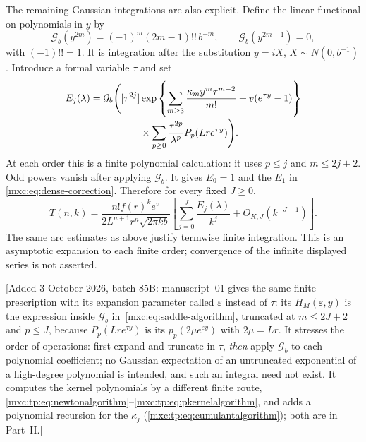 \documentclass[11pt]{article}
\numberwithin{equation}{section}
\theoremstyle{definition}
\theoremstyle{remark}
\begin{document}
The remaining Gaussian integrations are also explicit. Define the
linear functional on polynomials in $y$ by
\[
 \mathcal G_b(y^{2m})=(-1)^m(2m-1)!!\,b^{-m},\qquad
 \mathcal G_b(y^{2m+1})=0,
\]
with $(-1)!!=1$. It is integration after the substitution $y=iX$,
$X\sim N(0,b^{-1})$. Introduce a formal variable $\tau$ and set
\begin{align}
 E_j(\lambda)=\mathcal G_b\Bigg([\tau^{2j}]
 &\exp\left\{\sum_{m\ge3}\frac{\kappa_m y^m\tau^{m-2}}{m!}
                   +v(e^{\tau y}-1)\right\}\notag\\[-2pt]
 &\times\sum_{p\ge0}\frac{\tau^{2p}}{\lambda^p}
                          P_p(Lr e^{\tau y})\Bigg).
 \label{mxc:eq:saddle-algorithm}
\end{align}
At each order this is a finite polynomial calculation: it uses
$p\le j$ and $m\le2j+2$. Odd powers vanish after applying
$\mathcal G_b$. It gives $E_0=1$ and the $E_1$ in
\eqref{mxc:eq:dense-correction}. Therefore for every fixed $J\ge0$,
\begin{equation}\label{mxc:eq:dense-allorders}
 T(n,k)=\frac{n!f(r)^k e^v}{2L^{n+1}r^n\sqrt{2\pi k b}}
 \left[\sum_{j=0}^J\frac{E_j(\lambda)}{k^j}
                +O_{K,J}(k^{-J-1})\right].
\end{equation}
The same arc estimates as above justify termwise finite integration.
This is an asymptotic expansion to each finite order; convergence of
the infinite displayed series is not asserted.

[Added 3 October 2026, batch 85B: manuscript~01 gives the same finite
prescription with its expansion parameter called $\varepsilon$ instead of
$\tau$: its $H_M(\varepsilon,y)$ is the expression inside $\mathcal G_b$
in~\eqref{mxc:eq:saddle-algorithm}, truncated at $m\le2J+2$ and $p\le J$,
because $P_p(Lre^{\tau y})$ is its $p_p(2\mu e^{\varepsilon y})$ with
$2\mu=Lr$. It stresses the order of operations: first expand and truncate
in $\tau$, \emph{then} apply $\mathcal G_b$ to each polynomial coefficient;
no Gaussian expectation of an untruncated exponential of a high-degree
polynomial is intended, and such an integral need not exist. It computes
the kernel polynomials by a different finite route,
\eqref{mxc:tp:eq:newtonalgorithm}--\eqref{mxc:tp:eq:pkernelalgorithm}, and
adds a polynomial recursion for the $\kappa_j$
(\eqref{mxc:tp:eq:cumulantalgorithm}); both are in Part~II.]
\end{document}
